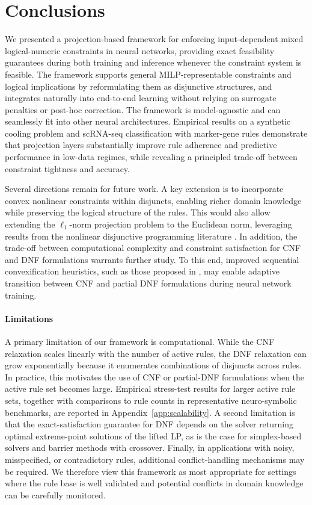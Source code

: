 \documentclass{article}
\theoremstyle{plain}
\theoremstyle{definition}
\theoremstyle{remark}
\begin{document}
\section{Conclusions}

We presented a projection-based framework for enforcing input-dependent mixed logical-numeric constraints in neural networks, providing exact feasibility guarantees during both training and inference whenever the constraint system is feasible. The framework supports general MILP-representable constraints and logical implications by reformulating them as disjunctive structures, and integrates naturally into end-to-end learning without relying on surrogate penalties or post-hoc correction. The framework is model-agnostic and can seamlessly fit into other neural architectures. Empirical results on a synthetic cooling problem and scRNA-seq classification with marker-gene rules demonstrate that projection layers substantially improve rule adherence and predictive performance in low-data regimes, while revealing a principled trade-off between constraint tightness and accuracy.

Several directions remain for future work. A key extension is to incorporate convex nonlinear constraints within disjuncts, enabling richer domain knowledge while preserving the logical structure of the rules. This would also allow extending the $\ell_1$-norm projection problem to the Euclidean norm, leveraging results from the nonlinear disjunctive programming literature \cite{ceria1999convex}. In addition, the trade-off between computational complexity and constraint satisfaction for CNF and DNF formulations warrants further study. To this end, improved sequential convexification heuristics, such as those proposed in \cite{Li2019}, may enable adaptive transition between CNF and partial DNF formulations during neural network training.

\paragraph{Limitations}
A primary limitation of our framework is computational. While the CNF relaxation scales linearly with the number of active rules, the DNF relaxation can grow exponentially because it enumerates combinations of disjuncts across rules. In practice, this motivates the use of CNF or partial-DNF formulations when the active rule set becomes large. Empirical stress-test results for larger active rule sets, together with comparisons to rule counts in representative neuro-symbolic benchmarks, are reported in Appendix~\ref{app:scalability}. A second limitation is that the exact-satisfaction guarantee for DNF depends on the solver returning optimal extreme-point solutions of the lifted LP, as is the case for simplex-based solvers and barrier methods with crossover. Finally, in applications with noisy, misspecified, or contradictory rules, additional conflict-handling mechanisms may be required. We therefore view this framework as most appropriate for settings where the rule base is well validated and potential conflicts in domain knowledge can be carefully monitored. 
\end{document}

